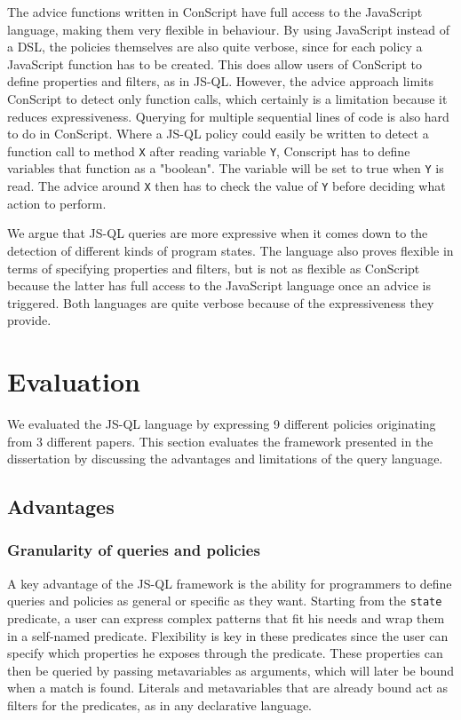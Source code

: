 The advice functions written in ConScript have full access to the JavaScript language, making them very flexible in behaviour. By using JavaScript instead of a DSL, the policies themselves are also quite verbose, since for each policy a JavaScript function has to be created. This does allow users of ConScript to define properties and filters, as in JS-QL. However, the advice approach limits ConScript to detect only function calls, which certainly is a limitation because it reduces expressiveness. Querying for multiple sequential lines of code is also hard to do in ConScript. Where a JS-QL policy could easily be written to detect a function call to method \texttt{X} after reading variable \texttt{Y}, Conscript has to define variables that function as a "boolean". The variable will be set to true when \texttt{Y} is read. The advice around \texttt{X} then has to check the value of \texttt{Y} before deciding what action to perform.

We argue that JS-QL queries are more expressive when it comes down to the detection of different kinds of program states. The language also proves flexible in terms of specifying properties and filters, but is not as flexible as ConScript because the latter has full access to the JavaScript language once an advice is triggered. Both languages are quite verbose because of the expressiveness they provide.


\section{Evaluation}
\label{sec:ValidationEvaluation}
We evaluated the JS-QL language by expressing 9 different policies originating from 3 different papers. This section evaluates the framework presented in the dissertation by discussing the advantages and limitations of the query language.

\subsection{Advantages}

\subsubsection*{Granularity of queries and policies}
A key advantage of the JS-QL framework is the ability for programmers to define queries and policies as general or specific as they want. Starting from the \texttt{state} predicate, a user can express complex patterns that fit his needs and wrap them in a self-named predicate. Flexibility is key in these predicates since the user can specify which properties he exposes through the predicate. These properties can then be queried by passing metavariables as arguments, which will later be bound when a match is found. Literals and metavariables that are already bound act as filters for the predicates, as in any declarative language.

